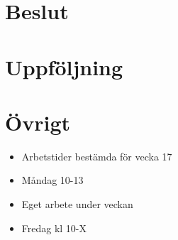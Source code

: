 \section*{Beslut}

\section*{Uppföljning}

\section*{Övrigt}
\begin{itemize}
	\item Arbetstider bestämda för vecka 17
	\item Måndag 10-13
	\item Eget arbete under veckan
	\item Fredag kl 10-X
\end{itemize}
